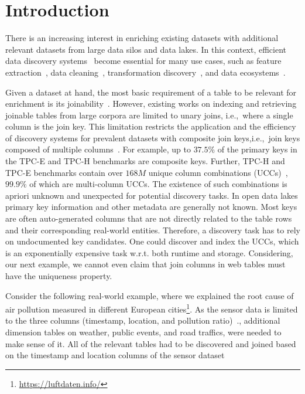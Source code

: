 
\section{Introduction} \label{sec:introduction}
There is an increasing interest in enriching existing datasets with additional relevant datasets from large data silos and data lakes.
In this context, efficient data discovery systems~\cite{fernandez2018aurum,miller2018open} become essential for many use cases, such as
feature extraction~\cite{nargesian2018table, esmailoghli2021cocoa, chepurko13arda, santos2021correlation}, data cleaning~\cite{yu2016string}, 
transformation discovery~\cite{DBLP:conf/btw/ozmenEA21, abedjan2015dataxformer}, and data ecosystems~\cite{agora}.

Given a dataset at hand, the most basic requirement of a table to be relevant for enrichment is its joinability~\cite{nargesian2020organizing, xiao2009top, zhu2019josie, chaudhuri2006primitive, yu2016string, fernandez2019lazo, esmailoghlicafe, esmailoghli2021cocoa, dong2021efficient, fernandez2018aurum, DBLP:journals/pvldb/ZhuNPM16, santos2021correlation}.
However, existing works on indexing and retrieving joinable tables from large corpora are limited to unary joins, i.e.,~where a single column is the join key. 
This limitation restricts the application and the efficiency of discovery systems for prevalent datasets with composite join keys,i.e.,~join keys composed of multiple columns~\cite{jiang2019holistic}.
For example, up to $37.5\%$ of the primary keys in the TPC-E and TPC-H benchmarks are composite keys.
Further, TPC-H and TPC-E benchmarks contain over $168M$ unique column combinations (UCCs)~\cite{heise2013scalable}, $99.9\%$ of which are  multi-column UCCs. The existence of such combinations is apriori unknown and unexpected for potential discovery tasks. In open data lakes primary key information and other metadata are generally not known. Most keys are often auto-generated columns that are not directly related to the table rows and their corresponding real-world entities. 
Therefore, a discovery task has to rely on undocumented key candidates. One could discover and index the UCCs, which is an exponentially expensive task w.r.t. both runtime and storage. Considering, our next example, we cannot even claim that join columns in web tables must have the uniqueness property.

Consider the following real-world example, where we explained the root cause of air  pollution measured in different European cities\footnote{\url{https://luftdaten.info/}}.
As the sensor data is limited to the three columns (timestamp, location, and pollution ratio)~\cite{meyerparticulate}., additional dimension tables on weather, public events, and road traffics, were needed to make sense of it. All of the relevant tables had to be discovered and joined based on the timestamp and location columns of the sensor dataset~\cite{meyerparticulate}

